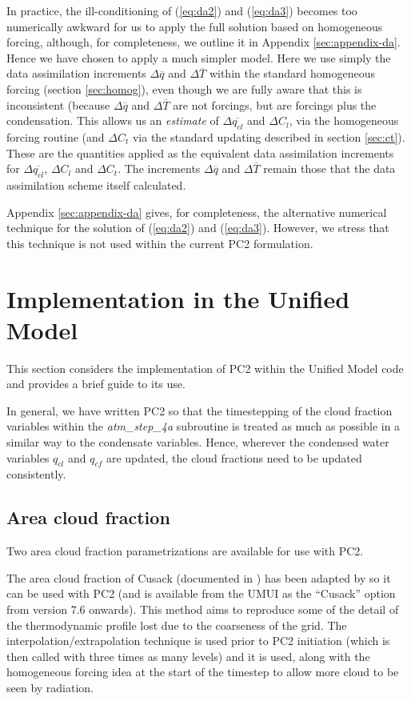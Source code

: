 \documentclass{UMDP_article}
\begin{document}
In practice, the ill-conditioning of (\ref{eq:da2}) and (\ref{eq:da3}) becomes too
numerically awkward for us to apply the full solution based on homogeneous
forcing, although, for completeness, we outline it in Appendix
\ref{sec:appendix-da}. Hence we have
chosen to apply a much simpler model. Here we use simply the data assimilation
increments $\Delta \overline{q}$ and $\Delta \overline{T}$ within the standard
homogeneous forcing (section \ref{sec:homog}), even though we are fully
aware that this is inconsistent (because $\Delta \overline{q}$ and $\Delta
\overline{T}$ are not forcings, but are forcings plus the condensation.
This allows us an \textit{estimate} of $\Delta \overline{q_{cl}}$ and $\Delta{C_l}$,
via the homogeneous forcing routine (and $\Delta C_t$ via the standard
updating described in section \ref{sec:ct}). These are the quantities applied
as the equivalent data assimilation increments for $\Delta \overline{q_{cl}}$,
$\Delta{C_l}$ and $\Delta C_t$. The increments $\Delta \overline{q}$ and
$\Delta \overline{T}$ remain those that the data assimilation scheme itself
calculated.

Appendix \ref{sec:appendix-da} gives, for completeness, the alternative
numerical technique for the solution of (\ref{eq:da2}) and (\ref{eq:da3}).
However, we stress that this technique is not used within the current
PC2 formulation.

\section{Implementation in the Unified Model}
\label{sec:um}

This section considers the implementation of PC2 within the Unified Model
code and provides a brief guide to its use.

In general, we have written PC2 so that the timestepping of the
cloud fraction variables within the \textit{atm\_step\_4a}
subroutine is treated as much as possible in a similar way to
the condensate variables.
Hence, wherever the condensed water variables $q_{cl}$ and $q_{cf}$
are updated, the cloud fractions need to be updated consistently.

\subsection{Area cloud fraction}
\label{sec:acf}

Two area cloud fraction parametrizations are available for use with PC2.

The area cloud fraction of Cusack (documented in ) has been 
adapted by \cite{boutle_morcrette10} so it can be used with PC2 (and is available from the UMUI as the 
``Cusack'' option from version 7.6 onwards). This method aims to 
reproduce some of the detail of the thermodynamic 
profile lost due to the coarseness of the grid. The interpolation/extrapolation technique is
used prior to PC2 initiation (which is then called with three times as many levels)
and it is used, along with the homogeneous forcing idea at the start of the timestep to
allow more cloud to be seen by radiation.
\end{document}
